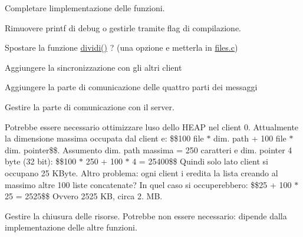 
\begin{DoxyRefList}
\item[\label{todo__todo000001}%
\Hypertarget{todo__todo000001}%
File \hyperlink{client_8c}{client.c} ]Completare l\textquotesingle{}implementazione delle funzioni. 

Rimuovere printf di debug o gestirle tramite flag di compilazione. 

Spostare la funzione \hyperlink{client_8c_a55586f2b7e9b3620294cf78cda8abdad}{dividi()} ? (una opzione e\textquotesingle{} metterla in \hyperlink{files_8c}{files.\+c}) 
\item[\label{todo__todo000005}%
\Hypertarget{todo__todo000005}%
Globale \hyperlink{client_8h_a54b47b58f228d7bc9827d2919687e25a}{operazioni\+\_\+figlio} (char $\ast$file\+Path)]Aggiungere la sincronizzazione con gli altri client

Aggiungere la parte di comunicazione delle quattro parti dei messaggi 
\item[\label{todo__todo000002}%
\Hypertarget{todo__todo000002}%
Globale \hyperlink{server_8c_a48d605ff689f470746c858648f0a98c2}{S\+I\+G\+I\+N\+T\+Signal\+Handler} (int sig)]Gestire la parte di comunicazione con il server.

Potrebbe essere necessario ottimizzare l\textquotesingle{}uso dello H\+E\+AP nel client 0. Attualmente la dimensione massima occupata dal client e\textquotesingle{}\+: \$\$100 file $\ast$ dim. path + 100 file $\ast$ dim. pointer\$\$. Assumento dim. path massima = 250 caratteri e dim. pointer 4 byte (32 bit)\+: \$\$100 $\ast$ 250 + 100 $\ast$ 4 = 25400\$\$ Quindi solo lato client si occupano 25 K\+Byte. Altro problema\+: ogni client i eredita la lista creando al massimo altre 100 liste concatenate? In quel caso si occuperebbero\+: \$\$25 + 100 $\ast$ 25 = 2525\$\$ Ovvero 2525 KB, circa 2. MB. 
\item[\label{todo__todo000004}%
\Hypertarget{todo__todo000004}%
Globale \hyperlink{client_8h_a50b22adcb76198fcd9402a97ff4711bf}{S\+I\+G\+U\+S\+R1\+Signal\+Handler} (int sig)]Gestire la chiusura delle risorse. Potrebbe non essere necessario\+: dipende dalla implementazione delle altre funzioni.
\end{DoxyRefList}